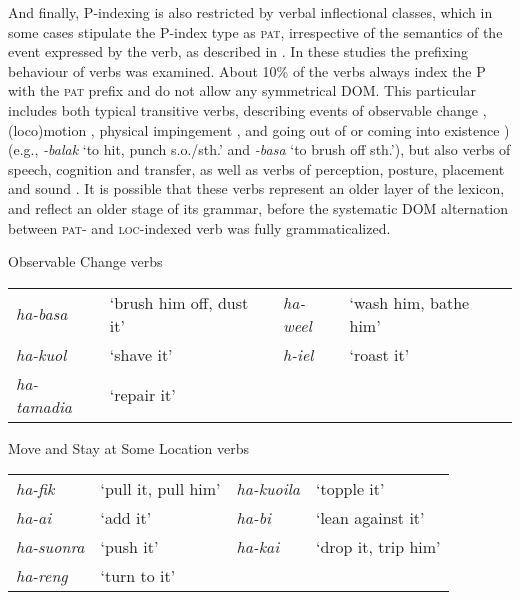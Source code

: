 \documentclass[output=paper]{LSP/langsci}
\begin{document}
And finally, P-indexing is also restricted by  verbal inflectional classes, which in some cases stipulate the P-index type as \textsc{pat}, irrespective of the semantics of the event expressed by the verb, as described in \cite{Feddenetal2013Feddenetal,Feddenetal2014Variation,FeddenBrown2017}. In these studies the prefixing behaviour of  verbs was examined. About 10\% of the verbs always index the P with the \textsc{pat} prefix and do not allow any symmetrical DOM. This particular  includes both typical transitive verbs, describing events of observable change , (loco)motion , physical impingement , and going out of or coming into existence ) (e.g., \textit{-balak} ‘to hit, punch s.o./sth.’ and \textit{-basa} ‘to brush off sth.’), but also verbs of speech, cognition and transfer, as well as verbs of perception, posture, placement and sound \citep{Feddenetal2014Variation,Kratochviletal2015Degrees}. It is possible that these verbs represent an older layer of the  lexicon, and reflect an older stage of its grammar, before the systematic DOM alternation between \textsc{pat}- and \textsc{loc}-indexed verb was fully grammaticalized.

\ea \label{03-kl-ex:33}
Observable Change verbs \citep[222]{Kratochviletal2015Degrees}\\
\begin{tabularx}{\textwidth}{ll ll}
\textit{ha-basa} & ‘brush him off, dust it’ & \textit{ha-weel} & ‘wash him, bathe him’\\
\textit{ha-kuol} & ‘shave it’ & \textit{h-iel} & ‘roast it’\\
\textit{ha-tamadia} & ‘repair it’\\
\end{tabularx}
\z

\ea \label{03-kl-ex:34}
Move and Stay at Some Location verbs \citep[223]{Kratochviletal2015Degrees}\\
\begin{tabularx}{\textwidth}{ll ll}
\textit{ha-fik} & ‘pull it, pull him’ & \textit{ha-kuoila} & ‘topple it’\\
\textit{ha-ai} & ‘add it’ & \textit{ha-bi} & ‘lean against it’\\
\textit{ha-suonra} & ‘push it’ & \textit{ha-kai} & ‘drop it, trip him’\\
\textit{ha-reng} & ‘turn to it’\\
\end{tabularx}
\z
\end{document}
